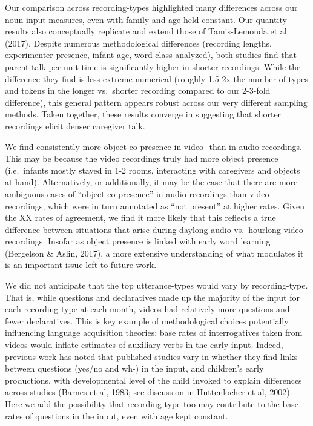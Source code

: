 \documentclass[floatsintext,man]{apa6}
\theoremstyle{definition}
\theoremstyle{definition}
\theoremstyle{definition}
\theoremstyle{remark}
\begin{document}
Our comparison across recording-types highlighted many differences
across our noun input measures, even with family and age held constant.
Our quantity results also conceptually replicate and extend those of
Tamis-Lemonda et al (2017). Despite numerous methodological differences
(recording lengths, experimenter presence, infant age, word class
analyzed), both studies find that parent talk per unit time is
significantly higher in shorter recordings. While the difference they
find is less extreme numerical (roughly 1.5-2x the number of types and
tokens in the longer vs.~shorter recording compared to our 2-3-fold
difference), this general pattern appears robust across our very
different sampling methods. Taken together, these results converge in
suggesting that shorter recordings elicit denser caregiver talk.

We find consistently more object co-presence in video- than in
audio-recordings. This may be because the video recordings truly had
more object presence (i.e.~infants mostly stayed in 1-2 rooms,
interacting with caregivers and objects at hand). Alternatively, or
additionally, it may be the case that there are more ambiguous cases of
\enquote{object co-presence} in audio recordings than video recordings,
which were in turn annotated as \enquote{not present} at higher rates.
Given the XX rates of agreement, we find it more likely that this
reflects a true difference between situations that arise during
daylong-audio vs.~hourlong-video recordings. Insofar as object presence
is linked with early word learning (Bergelson \& Aslin, 2017), a more
extensive understanding of what modulates it is an important issue left
to future work.

We did not anticipate that the top utterance-types would vary by
recording-type. That is, while questions and declaratives made up the
majority of the input for each recording-type at each month, videos had
relatively more questions and fewer declaratives. This is key example of
methodological choices potentially influencing language acquisition
theories: base rates of interrogatives taken from videos would inflate
estimates of auxiliary verbs in the early input. Indeed, previous work
has noted that published studies vary in whether they find links between
questions (yes/no and wh-) in the input, and children's early
productions, with developmental level of the child invoked to explain
differences across studies (Barnes et al, 1983; see discussion in
Huttenlocher et al, 2002). Here we add the possibility that
recording-type too may contribute to the base-rates of questions in the
input, even with age kept constant.
\end{document}
